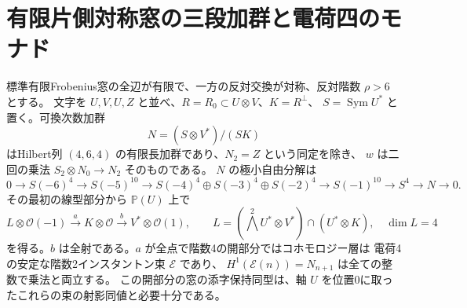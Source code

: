 \section{有限片側対称窓の三段加群と電荷四のモナド}
\label{sec:finite-symmetric-instanton-monad}
\begin{theorem}\label{thm:finite-symmetric-instanton-monad}
標準有限Frobenius窓の全辺が有限で、一方の反対交換が対称、反対階数 $\rho>6$ とする。
文字を $U,V,U,Z$ と並べ、$R=R_0\subset U\otimes V$、$K=R^\perp$、
$S=\operatorname{Sym}U^*$ と置く。可換次数加群
\[
 N=(S\otimes V^*)/(S K)
\]
はHilbert列 $(4,6,4)$ の有限長加群であり、$N_2=Z$ という同定を除き、
$w$ は二回の乗法 $S_2\otimes N_0\to N_2$ そのものである。
$N$ の極小自由分解は
\[
 0\to S(-6)^4\to S(-5)^{10}\to
 S(-4)^4\oplus S(-3)^4\oplus S(-2)^4\to S(-1)^{10}\to S^4\to N\to0 .
\]
その最初の線型部分から $\mathbb P(U)$ 上で
\[
 L\otimes\mathcal O(-1)\xrightarrow{a}K\otimes\mathcal O
 \xrightarrow{b}V^*\otimes\mathcal O(1),\qquad
 L=(\textstyle\bigwedge^2 U^*\otimes V^*)\cap(U^*\otimes K),\quad \dim L=4
\]
を得る。$b$ は全射である。$a$ が全点で階数4の開部分ではコホモロジー層は
電荷4の安定な階数2インスタントン束 $\mathcal E$ であり、
$H^1(\mathcal E(n))=N_{n+1}$ は全ての整数で乗法と両立する。
この開部分の窓の添字保持同型は、軸 $U$ を位置0に取ったこれらの束の射影同値と必要十分である。
\end{theorem}
